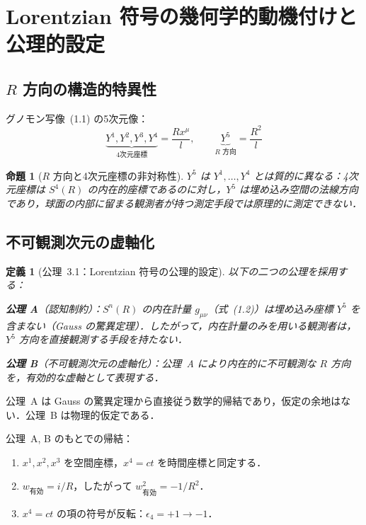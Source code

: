 \documentclass[12pt,a4paper]{ltjsarticle}
\newtheorem{proposition}[theorem]{命題}
\newtheorem{definition}[theorem]{定義}
\begin{document}
\section{Lorentzian 符号の幾何学的動機付けと公理的設定}

\subsection{$R$ 方向の構造的特異性}

グノモン写像~(1.1) の5次元像：
\[
\underbrace{Y^1, Y^2, Y^3, Y^4}_{\text{4次元座標}} = \frac{Rx^\mu}{l}, \qquad \underbrace{Y^5}_{\text{$R$ 方向}} = \frac{R^2}{l}
\]

\begin{proposition}[$R$ 方向と4次元座標の非対称性]\label{prop:asym}
$Y^5$ は $Y^1, \ldots, Y^4$ とは質的に異なる：4次元座標は $S^4(R)$ の内在的座標であるのに対し，$Y^5$ は埋め込み空間の法線方向であり，球面の内部に留まる観測者が持つ測定手段では原理的に測定できない．
\end{proposition}

\subsection{不可観測次元の虚軸化}

\begin{definition}[公理~3.1：Lorentzian 符号の公理的設定]\label{ax:lor}
以下の二つの公理を採用する：

\textbf{公理 A}（認知制約）：$S^n(R)$ の内在計量 $g_{\mu\nu}$（式~(1.2)）は埋め込み座標 $Y^5$ を含まない（Gauss の驚異定理）．したがって，内在計量のみを用いる観測者は，$Y^5$ 方向を直接観測する手段を持たない．

\textbf{公理 B}（不可観測次元の虚軸化）：公理~A により内在的に不可観測な $R$ 方向を，有効的な虚軸として表現する．
\end{definition}

公理~A は Gauss の驚異定理から直接従う数学的帰結であり，仮定の余地はない．公理~B は物理的仮定である．

公理~A, B のもとでの帰結：

\begin{enumerate}
\item[(i)] $x^1, x^2, x^3$ を空間座標，$x^4 = ct$ を時間座標と同定する．
\item[(ii)] $w_{\text{有効}} = i/R$，したがって $w_{\text{有効}}^2 = -1/R^2$．
\item[(iii)] $x^4 = ct$ の項の符号が反転：$\epsilon_4 = +1 \to -1$．
\end{enumerate}
\end{document}
